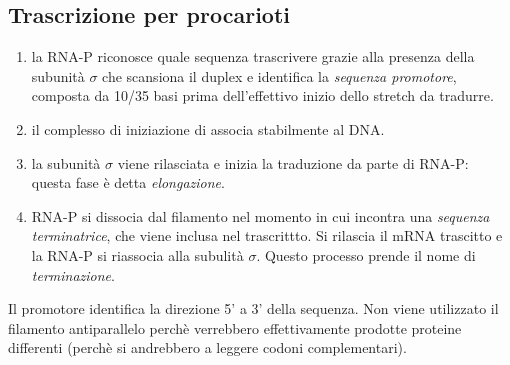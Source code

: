     \subsection{Trascrizione per procarioti}
        \begin{enumerate}
            \item la RNA-P riconosce quale sequenza trascrivere grazie alla presenza della subunità $\sigma$ che scansiona il duplex e identifica la \textit{sequenza promotore}, composta da 10/35 basi prima dell'effettivo inizio dello stretch da tradurre. 
            \item il complesso di iniziazione di associa stabilmente al DNA.
            \item la subunità $\sigma$ viene rilasciata e inizia la traduzione da parte di RNA-P: questa fase è detta \textit{elongazione}.
            \item RNA-P si dissocia dal filamento nel momento in cui incontra una \textit{sequenza terminatrice}, che viene inclusa nel trascrittto. Si rilascia il mRNA trascitto e la RNA-P si riassocia alla subulità $\sigma$. Questo processo prende il nome di \textit{terminazione}.
        \end{enumerate} 
        Il promotore identifica la direzione 5' a 3' della sequenza. Non viene utilizzato il filamento antiparallelo perchè verrebbero effettivamente prodotte proteine differenti (perchè si andrebbero a leggere codoni complementari).
    
